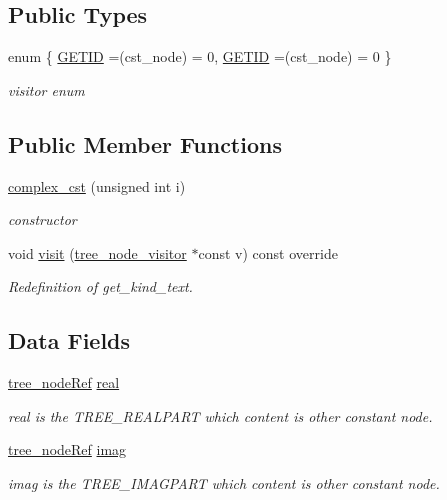 \subsection*{Public Types}
\begin{DoxyCompactItemize}
\item 
enum \{ \hyperlink{structcomplex__cst_a48f51342ee832a5586de6b8513d9b982a2c95f5d2e4431690f729294d5a050b98}{G\+E\+T\+ID} =(cst\+\_\+node) = 0, 
\hyperlink{structcomplex__cst_a48f51342ee832a5586de6b8513d9b982a2c95f5d2e4431690f729294d5a050b98}{G\+E\+T\+ID} =(cst\+\_\+node) = 0
 \}\begin{DoxyCompactList}\small\item\em visitor enum \end{DoxyCompactList}
\end{DoxyCompactItemize}
\subsection*{Public Member Functions}
\begin{DoxyCompactItemize}
\item 
\hyperlink{structcomplex__cst_afdb8800e87381d37211659eedf9507cb}{complex\+\_\+cst} (unsigned int i)
\begin{DoxyCompactList}\small\item\em constructor \end{DoxyCompactList}\item 
void \hyperlink{structcomplex__cst_aa98d0db16f586dd9ca9b16a468b67d2e}{visit} (\hyperlink{classtree__node__visitor}{tree\+\_\+node\+\_\+visitor} $\ast$const v) const override
\begin{DoxyCompactList}\small\item\em Redefinition of get\+\_\+kind\+\_\+text. \end{DoxyCompactList}\end{DoxyCompactItemize}
\subsection*{Data Fields}
\begin{DoxyCompactItemize}
\item 
\hyperlink{tree__node_8hpp_a6ee377554d1c4871ad66a337eaa67fd5}{tree\+\_\+node\+Ref} \hyperlink{structcomplex__cst_a6aa984499212d39509ae3cec0f8d4512}{real}
\begin{DoxyCompactList}\small\item\em real is the T\+R\+E\+E\+\_\+\+R\+E\+A\+L\+P\+A\+RT which content is other constant node. \end{DoxyCompactList}\item 
\hyperlink{tree__node_8hpp_a6ee377554d1c4871ad66a337eaa67fd5}{tree\+\_\+node\+Ref} \hyperlink{structcomplex__cst_aef2b08e051964d75a6d44d3031db8baa}{imag}
\begin{DoxyCompactList}\small\item\em imag is the T\+R\+E\+E\+\_\+\+I\+M\+A\+G\+P\+A\+RT which content is other constant node. \end{DoxyCompactList}\end{DoxyCompactItemize}

